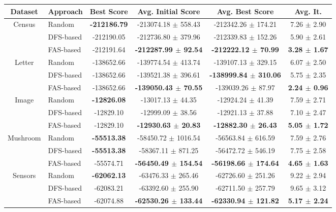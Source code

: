 \begin{table}[ h ]
	\centering
	\begin{tabular}{| c | l | c | c | c | c | }
		\hline
		Dataset & Approach & Best Score & Avg. Initial Score & Avg. Best Score & Avg. It. \\ \hline
		\multirow{3}{*}{Census} & Random & \textbf{-212186.79} & -213074.18 $\pm$ 558.43 & -212342.26 $\pm$ 174.21 & 7.26 $\pm$ 2.90 \\ \cline{2-6} 
				& DFS-based & -212190.05 & -212736.80 $\pm$ 379.96 & -212339.83 $\pm$ 152.26 & 5.90 $\pm$ 2.61 \\ \cline{2-6}
				& FAS-based & -212191.64 & \textbf{-212287.99 $\pm$ 92.54} & \textbf{-212222.12 $\pm$ 70.99} & \textbf{3.28 $\pm$ 1.67} \\ \hline \hline

		\multirow{3}{*}{Letter} & Random & -138652.66 & -139774.54 $\pm$ 413.74 & -139107.13 $\pm$ 329.15 & 6.07 $\pm$ 2.50 \\ \cline{2-6} 
				& DFS-based & -138652.66 & -139521.38 $\pm$ 396.61 & \textbf{-138999.84 $\pm$ 310.06} & 5.75 $\pm$ 2.35 \\ \cline{2-6}
				& FAS-based & -138652.66 & \textbf{-139050.43 $\pm$ 70.55} & -139039.26 $\pm$ 87.97 & \textbf{2.24 $\pm$ 0.96} \\ \hline \hline

		\multirow{3}{*}{Image} & Random & \textbf{-12826.08} & -13017.13 $\pm$ 44.35 & -12924.24 $\pm$ 41.39 & 7.59 $\pm$ 2.71 \\ \cline{2-6} 
				& DFS-based & -12829.10 & -12999.09 $\pm$ 38.56 & -12921.13 $\pm$ 37.88 & 7.10 $\pm$ 2.47 \\ \cline{2-6}
				& FAS-based & -12829.10 & \textbf{-12930.63 $\pm$ 20.83} & \textbf{-12882.30 $\pm$ 26.43} & \textbf{5.05 $\pm$ 1.72} \\ \hline \hline

		\multirow{3}{*}{Mushroom} & Random & \textbf{-55513.38} & -58450.72 $\pm$ 1016.54 & -56563.84 $\pm$ 616.59 & 7.59 $\pm$ 2.76 \\ \cline{2-6} 
				& DFS-based & \textbf{-55513.38} & -58367.11 $\pm$ 871.25 & -56472.72 $\pm$ 546.19 & 7.75 $\pm$ 2.58 \\ \cline{2-6}
				& FAS-based & -55574.71 & \textbf{-56450.49 $\pm$ 154.54} & \textbf{-56198.66 $\pm$ 174.64} & \textbf{4.65 $\pm$ 1.63} \\ \hline \hline

		\multirow{3}{*}{Sensors} & Random & \textbf{-62062.13} & -63476.33 $\pm$ 265.46 & -62726.60 $\pm$ 251.26 & 9.22 $\pm$ 2.94 \\ \cline{2-6} 
				& DFS-based & -62083.21 & -63392.60 $\pm$ 255.90 & -62711.50 $\pm$ 257.79 & 9.65 $\pm$ 3.12 \\ \cline{2-6}
				& FAS-based & -62074.88 & \textbf{-62530.26 $\pm$ 133.44} & \textbf{-62330.94 $\pm$ 121.82} & \textbf{5.17 $\pm$ 2.24} \\ \hline \hline


\end{tabular}
\end{table}

